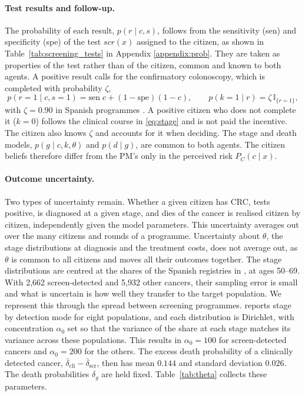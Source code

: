\documentclass[12pt]{article}
\begin{document}
\paragraph{Test results and follow-up.} The probability of each result, $p(r \mid c, s)$, follows from the sensitivity (sen) and specificity (spe) of the test $scr(x)$ assigned to the citizen, as shown in Table~\ref{tab:screening_tests} in Appendix \ref{appendix:prob}. They are taken as properties of the test rather than of the citizen, common and known to both agents. A positive result calls for the confirmatory colonoscopy, which is completed with probability $\zeta$,
\begin{equation}\label{eq:completion}
p(r = 1 \mid c, s = 1) = \mathrm{sen}\; c + (1 - \mathrm{spe})(1 - c), \qquad
p(k = 1 \mid r) = \zeta\, \mathbb{I}_{\{r = 1\}},
\end{equation}
with $\zeta = 0.90$ in Spanish programmes \citep{redcribado2021, moss2012}. A positive citizen who does not complete it ($k = 0$) follows the clinical course in \eqref{eq:stage} and is not paid the incentive. The citizen also knows $\zeta$ and accounts for it when deciding. The stage and death models, $p(g \mid c, k, \theta)$ and $p(d \mid g)$, are common to both agents. The citizen beliefs therefore differ from the PM's only in the perceived risk $P_C(c \mid x)$.

\paragraph{Outcome uncertainty.} Two types of uncertainty remain. Whether a given citizen has CRC, tests positive, is diagnosed at a given stage, and dies of the cancer is realised citizen by citizen, independently given the model parameters. This uncertainty averages out over the many citizens and rounds of a programme. Uncertainty about $\theta$, the stage distributions at diagnosis and the treatment costs, does not average out, as $\theta$ is common to all citizens and moves all their outcomes together. The stage distributions are centred at the shares of the Spanish registries in \citet{cardoso2022overall}, at ages 50--69. With 2{,}662 screen-detected and 5{,}932 other cancers, their sampling error is small and what is uncertain is how well they transfer to the target population. We represent this through the spread between screening programmes. \citet{cardoso2022overall} reports stage by detection mode for eight populations, and each distribution is Dirichlet, with concentration $\alpha_0$ set so that the variance of the share at each stage matches its variance across these populations. This results in $\alpha_0 = 100$ for screen-detected cancers and $\alpha_0 = 200$ for the others. The excess death probability of a clinically detected cancer, $\bar\delta_{\text{cli}} - \bar\delta_{\text{scr}}$, then has mean $0.144$ and standard deviation $0.026$. The death probabilities $\delta_g$ are held fixed. Table~\ref{tab:theta} collects these parameters.
\end{document}
